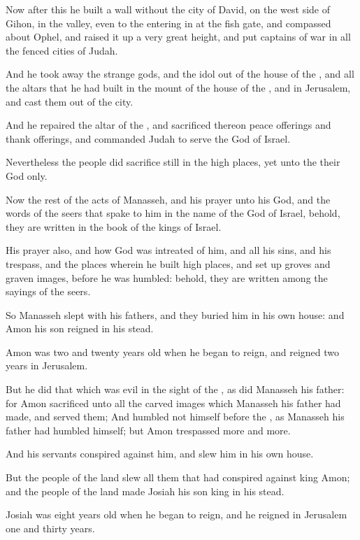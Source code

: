 \Verse Now after this he built a wall without the city of David, on the west side of Gihon, in the valley, even to the entering in at the fish gate, and compassed about Ophel, and raised it up a very great height, and put captains of war in all the fenced cities of Judah.

\Verse And he took away the strange gods, and the idol out of the house of the \LORD, and all the altars that he had built in the mount of the house of the \LORD, and in Jerusalem, and cast them out of the city.

\Verse And he repaired the altar of the \LORD, and sacrificed thereon peace offerings and thank offerings, and commanded Judah to serve the \LORD God of Israel.

\Verse Nevertheless the people did sacrifice still in the high places, yet unto the \LORD their God only.

\Verse Now the rest of the acts of Manasseh, and his prayer unto his God, and the words of the seers that spake to him in the name of the \LORD God of Israel, behold, they are written in the book of the kings of Israel.

\Verse His prayer also, and how God was intreated of him, and all his sins, and his trespass, and the places wherein he built high places, and set up groves and graven images, before he was humbled: behold, they are written among the sayings of the seers.

\Verse So Manasseh slept with his fathers, and they buried him in his own house: and Amon his son reigned in his stead.

\Verse Amon was two and twenty years old when he began to reign, and reigned two years in Jerusalem.

\Verse But he did that which was evil in the sight of the \LORD, as did Manasseh his father: for Amon sacrificed unto all the carved images which Manasseh his father had made, and served them; \Verse And humbled not himself before the \LORD, as Manasseh his father had humbled himself; but Amon trespassed more and more.

\Verse And his servants conspired against him, and slew him in his own house.

\Verse But the people of the land slew all them that had conspired against king Amon; and the people of the land made Josiah his son king in his stead.


\Chapter
\Verse Josiah was eight years old when he began to reign, and he reigned in Jerusalem one and thirty years.

